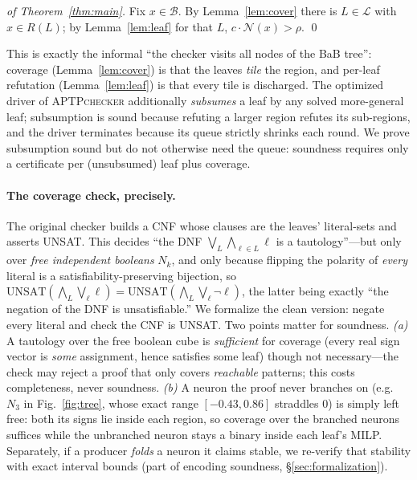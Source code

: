 \documentclass[runningheads]{llncs}
\newcommand{\net}{\mathcal{N}}
\newcommand{\reg}{R}
\newcommand{\dom}{\mathcal{B}}          %
\newcommand{\leaf}{L}
\newcommand{\leaves}{\mathcal{L}}
\newcommand{\pytool}{\textsc{APTPchecker}}
\begin{document}
\begin{proof}[of Theorem~\ref{thm:main}]
Fix $x\in\dom$. By Lemma~\ref{lem:cover} there is $\leaf\in\leaves$ with
$x\in\reg(\leaf)$; by Lemma~\ref{lem:leaf} for that $\leaf$,
$c\cdot\net(x)>\rho$. \qed
\end{proof}

This is exactly the informal ``the checker visits all nodes of the BaB tree'':
coverage (Lemma~\ref{lem:cover}) is that the leaves \emph{tile} the region, and
per-leaf refutation (Lemma~\ref{lem:leaf}) is that every tile is discharged. The
optimized driver of \pytool{} additionally \emph{subsumes} a leaf by any solved
more-general leaf; subsumption is sound because refuting a larger region refutes
its sub-regions, and the driver terminates because its queue strictly shrinks each
round. We prove subsumption sound but do not otherwise need the queue: soundness
requires only a certificate per (unsubsumed) leaf plus coverage.

\paragraph{The coverage check, precisely.}\label{par:coverage}
The original checker builds a CNF whose clauses are the leaves' literal-sets and
asserts UNSAT. This decides ``the DNF $\bigvee_{\leaf}\bigwedge_{\ell\in\leaf}\ell$
is a tautology''---but only over \emph{free independent booleans} $N_k$, and only
because flipping the polarity of \emph{every} literal is a satisfiability-preserving
bijection, so $\mathrm{UNSAT}\!\left(\bigwedge_\leaf\bigvee_\ell \ell\right)
=\mathrm{UNSAT}\!\left(\bigwedge_\leaf\bigvee_\ell \lnot\ell\right)$, the latter being
exactly ``the negation of the DNF is unsatisfiable.'' We formalize the clean version:
negate every literal and check the CNF is UNSAT. Two points matter for soundness.
\emph{(a)} A tautology over the free boolean cube is \emph{sufficient} for coverage
(every real sign vector is \emph{some} assignment, hence satisfies some leaf) though
not necessary---the check may reject a proof that only covers \emph{reachable}
patterns; this costs completeness, never soundness. \emph{(b)} A neuron the proof
never branches on (e.g.\ $N_3$ in Fig.~\ref{fig:tree}, whose exact range
$[-0.43,0.86]$ straddles $0$) is simply left free: both its signs lie inside each
region, so coverage over the branched neurons suffices while the unbranched neuron
stays a binary inside each leaf's MILP. Separately, if a producer \emph{folds} a
neuron it claims stable, we re-verify that stability with exact interval bounds (part
of encoding soundness, \S\ref{sec:formalization}).
\end{document}
